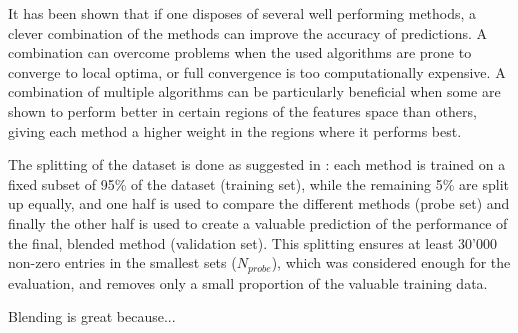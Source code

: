 It has been shown that if one disposes of several well performing methods,
a clever combination of the methods can improve the accuracy of predictions.   
A combination can overcome problems when the used algorithms are prone to
converge to local optima, or full convergence is too computationally expensive.
\cite{Dietterich}
A combination of multiple algorithms can be particularly beneficial when some
are shown to perform better in certain regions of the features space than
others, giving each method a higher weight in the regions where it performs
best.

The splitting of the dataset is done as suggested in
\cite{PresentationGrandPrize}: each method is trained on a fixed subset of 95\% of the
dataset (training set), while the remaining 5\% are split up equally, and one half is used to
compare the different methods (probe set) and finally the other half is used to create a
valuable prediction of the performance of the final, blended method (validation
set).  
This splitting ensures at least 30'000 non-zero entries in the smallest sets
($N_{probe}$),
which was considered enough for the evaluation, and removes only a small
proportion of the valuable training data.

Blending is great because...
